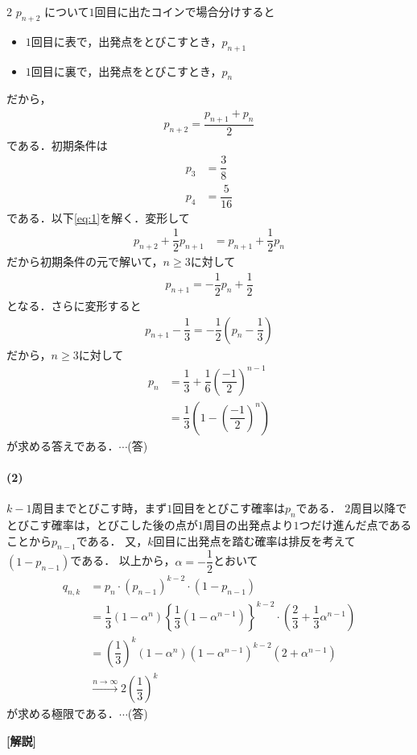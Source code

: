 \documentclass[../../main.tex]{subfiles}
\begin{document}
\begin{multicols}{2}
  $p_{n+2}$ について$1$回目に出たコインで場合分けすると
  \begin{itemize}
    \item $1$回目に表で，出発点をとびこすとき，$p_{n+1}$
    \item $1$回目に裏で，出発点をとびこすとき，$p_n$
  \end{itemize}
  だから，
  \begin{align}
    p_{n+2} = \dfrac{p_{n+1} + p_n}{2} \label{eq:1}
  \end{align}
  である．初期条件は
  \begin{align}
    p_3 & =\dfrac{3}{8}  \\
    p_4 & =\dfrac{5}{16}
  \end{align}
  である．以下\cref{eq:1}を解く．変形して
  \begin{align}
    p_{n+2}+\dfrac{1}{2}p_{n+1} & = p_{n+1}+\dfrac{1}{2}p_{n}
  \end{align}
  だから初期条件の元で解いて，$n\ge 3$に対して
  \begin{align}
    p_{n+1} = -\dfrac{1}{2}p_{n}+\dfrac{1}{2}
  \end{align}
  となる．さらに変形すると
  \begin{align}
    p_{n+1}-\dfrac{1}{3} = -\dfrac{1}{2}\left(p_{n}-\dfrac{1}{3}\right)
  \end{align}
  だから，$n\ge 3$に対して
  \begin{align}
    p_n
    & = \dfrac{1}{3} + \dfrac{1}{6}\left(\dfrac{-1}{2}\right)^{n-1} \\
    & = \dfrac{1}{3}\left(1-\left(\dfrac{-1}{2}\right)^{n}\right)
  \end{align}
  が求める答えである．$\cdots$(答)

  \paragraph{(2)}
  $k-1$周目までとびこす時，まず$1$回目をとびこす確率は$p_n$である．
  $2$周目以降でとびこす確率は，とびこした後の点が$1$周目の出発点より$1$つだけ進んだ点であることから$p_{n-1}$である．
  又，$k$回目に出発点を踏む確率は排反を考えて$(1-p_{n-1})$である．
  以上から，$\alpha=-\dfrac{1}{2}$とおいて
  \begin{align}
    q_{n,k}
    & =  p_n \cdot (p_{n-1})^{k-2} \cdot (1-p_{n-1}) \\
    & =  \dfrac{1}{3}(1-\alpha^n) \left\{ \dfrac{1}{3}(1-\alpha^{n-1}) \right\}^{k-2} \cdot \left(\dfrac{2}{3}+\dfrac{1}{3}\alpha^{n-1}\right) \\
    & =  \left(\dfrac{1}{3}\right)^{k}(1-\alpha^n)(1-\alpha^{n-1})^{k-2} \left(2+\alpha^{n-1}\right)                 \\
    &\xrightarrow{n\to\infty}  2\left(\dfrac{1}{3}\right)^k
  \end{align}
  が求める極限である．$\cdots$(答)

  {\bf [解説]}
  \newpage
\end{multicols}
\end{document}
